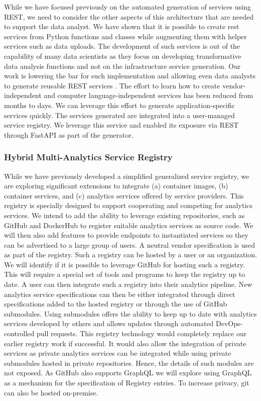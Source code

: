 While we have focused previously on the automated generation of
services using REST, we need to consider the other aspects of this
architecture that are needed to support the data analyst. We have
shown that it is possible to create rest services from Python
functions and classes while augmenting them with helper services such
as data uploads. The development of such services is out of the
capability of many data scientists as they focus on developing
transformative data analysis functions and not on the infrastructure
service generation. Our work is lowering the bar for such
implementation and allowing even data analysts to generate reusable
REST services \cite{las21openapi}. The effort to learn how to
create vendor-independent and computer language-independent services
has been reduced from months to days. We can leverage this effort to
generate application-specific services quickly. The services generated
are integrated into a user-managed service registry. We leverage
this service and enabled its exposure via REST through FastAPI as part
of the generator.

\subsubsection{Hybrid Multi-Analytics Service Registry}


While we have previously developed a simplified generalized service
registry, we are exploring significant extensions to integrate (a)
container images, (b) container services, and (c) analytics 
services offered by service providers. This registry is specially
designed to support cooperating and competing for analytics services.
We intend to add the ability to leverage existing repositories, such as
GitHub and DockerHub to register suitable analytics services as source
code. We will then also add features to provide endpoints to
instantiated services so they can be advertised to a large group of
users. A neutral vendor specification is used as part of the
registry. Such a registry can be hosted by a user or an
organization. We will identify if it is possible to leverage GitHub
for hosting such a registry. This will require a special set of tools
and programs to keep the registry up to date. A user can then
integrate such a registry into their analytics pipeline. New analytics
service specifications can then be either integrated through direct
specifications added to the hosted registry or through the use of
GitHub submodules. Using submodules offers the ability to keep up to
date with analytics services developed by others and allows updates
through automated DevOps-controlled pull requests. This registry
technology would completely replace our earlier registry work if
successful. It would also allow the integration of private services as
private analytics services can be integrated while using private
submodules hosted in private repositories. Hence, the details of such
modules are not exposed. As GitHub also supports GraphQL we will
explore using GraphQL as a mechanism for the specification of Registry
entries. To increase privacy, git can also be hosted on-premise.

